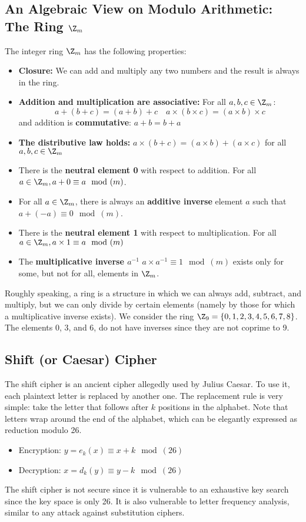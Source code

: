 \documentclass{math}
\begin{document}
\subsection*{An Algebraic View on Modulo Arithmetic: The Ring \( \Z_m \)}
The integer ring \( \Z_m \) has the following properties:
\begin{itemize}
  \item \textbf{Closure:} We can add and multiply any two numbers and the result
  is always in the ring.
  \item \textbf{Addition and multiplication are associative:} For all \( a,b,c
  \in \Z_m \):
  \[ a+(b+c) = (a+b)+c \quad a\times(b\times c) = (a\times b)\times c \]
  and addition is \textbf{commutative}: \( a+b = b+a \)
  \item \textbf{The distributive law holds:} \( a\times(b+c) = (a\times
  b)+(a\times c) \) for all \( a,b,c\in\Z_m \)
  \item There is the \textbf{neutral element 0} with respect to addition. For
  all \( a\in\Z_m, a+0\equiv a\mod(m) \).
  \item For all \( a\in\Z_m \), there is always an \textbf{additive inverse}
  element \( a \) such that \( a+(-a) \equiv 0\mod(m) \).
  \item There is the \textbf{neutral element 1} with respect to multiplication.
  For all \( a\in\Z_m, a\times1 \equiv a\mod(m) \)
  \item The \textbf{multiplicative inverse \( a^{-1} \)} \( a\times a^{-1}
  \equiv 1\mod(m) \) exists only for some, but not for all, elements in
  \( \Z_m \).
\end{itemize}
Roughly speaking, a ring is a structure in which we can always add, subtract,
and multiply, but we can only divide by certain elements (namely by those for
which a multiplicative inverse exists). We consider the ring \( \Z_9 = \{0,1,2,
3,4,5,6,7,8\} \). The elements 0, 3, and 6, do not have inverses since they are
not coprime to 9.

\subsection*{Shift (or Caesar) Cipher}
The shift cipher is an ancient cipher allegedly used by Julius Caesar. To use
it, each plaintext letter is replaced by another one. The replacement rule is
very simple: take the letter that follows after \( k \) positions in the
alphabet. Note that letters wrap around the end of the alphabet, which can be
elegantly expressed as reduction modulo 26.
\begin{itemize}
  \item Encryption: \( y = e_k(x) \equiv x+k\mod(26) \)
  \item Decryption: \( x = d_k(y) \equiv y-k\mod(26) \)
\end{itemize}
The shift cipher is not secure since it is vulnerable to an exhaustive key
search since the key space is only 26. It is also vulnerable to letter
frequency analysis, similar to any attack against substitution ciphers.
\end{document}
